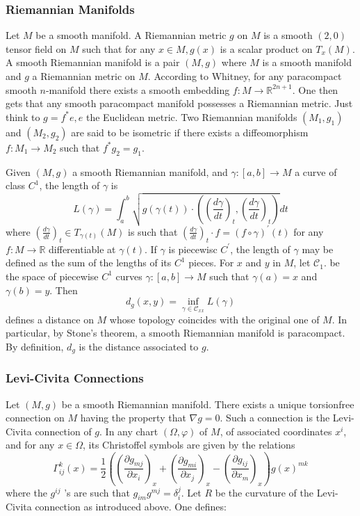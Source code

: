 \documentclass[12pt,hyperref,a4paper,UTF8]{ctexart}
\begin{document}
\subsubsection{Riemannian Manifolds}
Let $M$ be a smooth manifold. A Riemannian metric $g$ on $M$ is a smooth $(2,0)$ tensor field on $M$ such that for any $x \in M, g(x)$ is a scalar product on $T_x(M)$. A smooth Riemannian manifold is a pair $(M, g)$ where $M$ is a smooth manifold and $g$ a Riemannian metric on $M$. According to Whitney, for any paracompact smooth $n$-manifold there exists a smooth embedding $f: M \rightarrow \mathbb{R}^{2 n+1}$. One then gets that any smooth paracompact manifold possesses a Riemannian metric. Just think to $g=f^* e, e$ the Euclidean metric. Two Riemannian manifolds $\left(M_1, g_1\right)$ and $\left(M_2, g_2\right)$ are said to be isometric if there exists a diffeomorphism $f: M_1 \rightarrow M_2$ such that $f^* g_2=g_1$.

\vskip 3pt
Given $(M, g)$ a smooth Riemannian manifold, and $\gamma:[a, b] \rightarrow M$ a curve of class $C^{1}$, the length of $\gamma$ is
$$
L(\gamma)=\int_a^b \sqrt{g(\gamma(t)) \cdot\left(\left(\frac{d \gamma}{d t}\right)_t,\left(\frac{d \gamma}{d t}\right)_t\right)} d t
$$
where $\left(\frac{d \gamma}{d t}\right)_t \in T_{\gamma(t)}(M)$ is such that $\left(\frac{d \gamma}{d t}\right)_t \cdot f=(f \circ \gamma)^{\prime}(t)$ for any $f: M \rightarrow \mathbb{R}$ differentiable at $\gamma(t)$. If $\gamma$ is piecewisc $C^{\prime}$, the length of $\gamma$ may be defined as the sum of the lengths of its $C^1$ pieces. For $x$ and $y$ in $M$, let $\mathcal{C}_1$. be the space of piecewise $C^1$ curves $\gamma:[a, b] \rightarrow M$ such that $\gamma(a)=x$ and $\gamma(b)=y$. Then
$$
d_g(x, y)=\inf _{\gamma \in \mathcal{C}_{xx}} L(\gamma)
$$
defines a distance on $M$ whose topology coincides with the original one of $M$. In particular, by Stone's theorem, a smooth Riemannian manifold is paracompact. By definition, $d_g$ is the distance associated to $g$.

\subsubsection{Levi-Civita Connections}
Let $(M, g)$ be a smooth Riemannian manifold. There exists a unique torsionfree connection on $M$ having the property that $\nabla g=0$. Such a connection is the Levi-Civita connection of $g$. In any chart $(\Omega, \varphi)$ of $M$, of associated coordinates $x^i$, and for any $x \in \Omega$, its Christoffel symbols are given by the relations
$$
\Gamma_{i j}^k(x)=\frac{1}{2}\left(\left(\frac{\partial g_{m j}}{\partial x_i}\right)_x+\left(\frac{\partial g_{m i}}{\partial x_j}\right)_x-\left(\frac{\partial g_{i j}}{\partial x_m}\right)_x\right) g(x)^{m k}
$$
where the $g^{i j}$ 's are such that $g_{i m} g^{m j}=\delta_i^j$. Let $R$ be the curvature of the Levi-Civita connection as introduced above. One defines:
\end{document}
